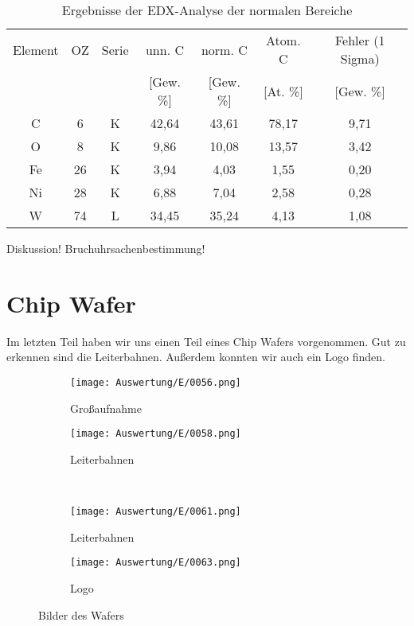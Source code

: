 \begin{table}[h]
    \centering
    \begin{tabular}{c|c|c|c|c|c|c}
        Element & OZ &Serie& unn. C & norm. C &  Atom. C  & Fehler (1 Sigma) \\
         & & & [Gew. \%] & [Gew. \%] & [At. \%] & [Gew. \%] \\
        \hline\hline
        C & 6 & K & 42,64 & 43,61 & 78,17 & 9,71\\
        O & 8 & K & 9,86 & 10,08 & 13,57 & 3,42\\
        Fe & 26 & K & 3,94 & 4,03 & 1,55 & 0,20\\
        Ni & 28 & K & 6,88 & 7,04 & 2,58 & 0,28\\
        W & 74 & L & 34,45 & 35,24 & 4,13 & 1,08
    \end{tabular}
    \caption{Ergebnisse der EDX-Analyse der normalen Bereiche}
\end{table}

Diskussion! Bruchuhrsachenbestimmung!

\newpage
\section{Chip Wafer}

Im letzten Teil haben wir uns einen Teil eines Chip Wafers vorgenommen. Gut zu erkennen sind die Leiterbahnen. Außerdem konnten wir auch ein Logo finden.

\begin{figure}[h]
    \centering
    
    \begin{subfigure}[b]{0.45\textwidth}
        \centering
        \texttt{[image: Auswertung/E/0056.png]}
        \caption{Großaufnahme}
    \end{subfigure}
    \hfill
    \begin{subfigure}[b]{0.45\textwidth}
        \centering
        \texttt{[image: Auswertung/E/0058.png]}
        \caption{Leiterbahnen}
    \end{subfigure}
    \\
    \begin{subfigure}[b]{0.45\textwidth}
        \centering
        \texttt{[image: Auswertung/E/0061.png]}
        \caption{Leiterbahnen}
    \end{subfigure}
    \hfill
    \begin{subfigure}[b]{0.45\textwidth}
        \centering
        \texttt{[image: Auswertung/E/0063.png]}
        \caption{Logo}
    \end{subfigure}
    \caption{Bilder des Wafers}
\end{figure}